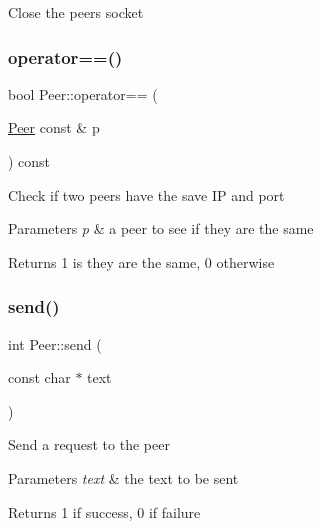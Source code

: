 Close the peer\textquotesingle{}s socket \mbox{\label{classPeer_a9a06bb1ad4da0564617bba731099a6eb}} 
\subsubsection{\texorpdfstring{operator==()}{operator==()}}
{\footnotesize\ttfamily bool Peer\+::operator== (\begin{DoxyParamCaption}\item[{\mbox{\hyperlink{classPeer}{Peer}} const \&}]{p }\end{DoxyParamCaption}) const\hspace{0.3cm}{\ttfamily [inline]}}

Check if two peers have the save IP and port


\begin{DoxyParams}{Parameters}
{\em p} & a peer to see if they are the same \\
\hline
\end{DoxyParams}
\begin{DoxyReturn}{Returns}
1 is they are the same, 0 otherwise 
\end{DoxyReturn}
\mbox{\label{classPeer_a0f591fdb4807871049e9471f7464fc6a}} 
\subsubsection{\texorpdfstring{send()}{send()}}
{\footnotesize\ttfamily int Peer\+::send (\begin{DoxyParamCaption}\item[{const char $\ast$}]{text }\end{DoxyParamCaption})}

Send a request to the peer


\begin{DoxyParams}{Parameters}
{\em text} & the text to be sent \\
\hline
\end{DoxyParams}
\begin{DoxyReturn}{Returns}
1 if success, 0 if failure 
\end{DoxyReturn}
\mbox{\label{classPeer_a44641ad4373c7e8f8237e0d976dc8321}} 
